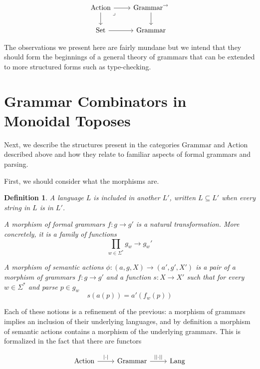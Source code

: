 \documentclass[12pt]{article}
\newcommand{\Set}{\textrm{Set}}
\newcommand{\Lang}{\textrm{Lang}}
\newcommand{\Grammar}{\textrm{Grammar}}
\newcommand{\Action}{\textrm{Action}}
\newtheorem{definition}{Definition}
\begin{document}
\[\begin{tikzcd}
	\Action & {\Grammar^\to} \\
	\Set & \Grammar
	\arrow[from=1-1, to=2-1]
	\arrow[from=2-1, to=2-2]
	\arrow[from=1-1, to=1-2]
	\arrow[from=1-2, to=2-2]
	\arrow["\lrcorner"{anchor=center, pos=0.125}, draw=none, from=1-1, to=2-2]
\end{tikzcd}\]

The observations we present here are fairly mundane but we intend that
they should form the beginnings of a general theory of grammars that
can be extended to more structured forms such as type-checking.

\section{Grammar Combinators in Monoidal Toposes}

Next, we describe the structures present in the categories $\Grammar$
and $\Action$ described above and how they relate to familiar aspects
of formal grammars and parsing.

First, we should consider what the morphisms are.

\begin{definition}
  A language $L$ is included in another $L'$, written $L \subseteq L'$
  when every string in $L$ is in $L'$.
  
  A morphism of formal grammars $f : g \to g'$ is a natural
  transformation. More concretely, it is a family of functions
  \[ \prod_{w \in \Sigma^*} g_w \to g_w' \]

  A morphism of semantic actions $\phi : (a,g,X) \to (a', g', X')$ is
  a pair of a morphism of grammars $f : g \to g'$ and a function $s :
  X \to X'$ such that for every $w \in \Sigma^*$ and parse $p \in g_w$
  \[ s(a(p)) = a'(f_w(p)) \]
\end{definition}

Each of these notions is a refinement of the previous: a morphism of
grammars implies an inclusion of their underlying languages, and by
definition a morphism of semantic actions contains a morphism of the
underlying grammars. This is formalized in the fact that there are
functors

\[\begin{tikzcd}
	\Action & \Grammar & \Lang
	\arrow["{|\cdot|}", from=1-1, to=1-2]
	\arrow["{||\cdot||}", from=1-2, to=1-3]
\end{tikzcd}\]
\end{document}
